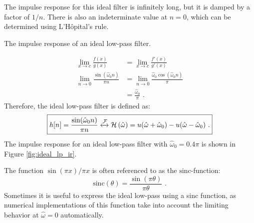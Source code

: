 The impulse response for this ideal filter is infinitely long, but it
is damped by a factor of $1/n$. There is also an indeterminate value
at $n=0$, which can be determined using L'H\^opital's rule.
\begin{marginfigure}
  \begin{center}
  \end{center}
  \caption{The impulse response of an ideal low-pass filter.}
  \label{fig:ideal_lp_ir}
\end{marginfigure}
\begin{align}
  \lim_{x\rightarrow c} \frac{f(x)}{g(x)}                   & = \lim_{x\rightarrow c} \frac{f'(x)}{g'(x)}                             \\
  \lim_{n\rightarrow 0} \frac{\sin(\hat{\omega}_0n)}{\pi n} & = \lim_{n\rightarrow 0} \frac{\hat{\omega}_0\cos(\hat{\omega}_0n)}{\pi} \\
                                                            & = \frac{\hat{\omega}_0}{\pi} \,\,.
\end{align}
Therefore, the ideal low-pass filter is defined as:
\begin{equation}
  \boxed{
    h[n]=\frac{\sin(\hat{\omega}_0 n)}{\pi n}  \xleftrightarrow{\mathcal{F}} \mathcal{H}\left(\hat{\omega}\right) = u(\hat{\omega}+\hat{\omega}_0)-u(\hat{\omega}-\hat{\omega}_0)\,\,.
  }
\end{equation}
The impulse response for an ideal low-pass filter with $\hat{\omega}_0
  = 0.4\pi$ is shown in Figure \ref{fig:ideal_lp_ir}.

The function $\sin(\pi x)/\pi x$ is often referenced to as the $\mathrm{sinc}$-function:
\begin{equation}
  \mathrm{sinc}(\theta) = \frac{\sin(\pi\theta)}{\pi \theta}\,\,.
\end{equation}
Sometimes it is useful to express the ideal low-pass using a sinc
function, as numerical implementations of this function take into
account the limiting behavior at $\hat{\omega}=0$ automatically.


